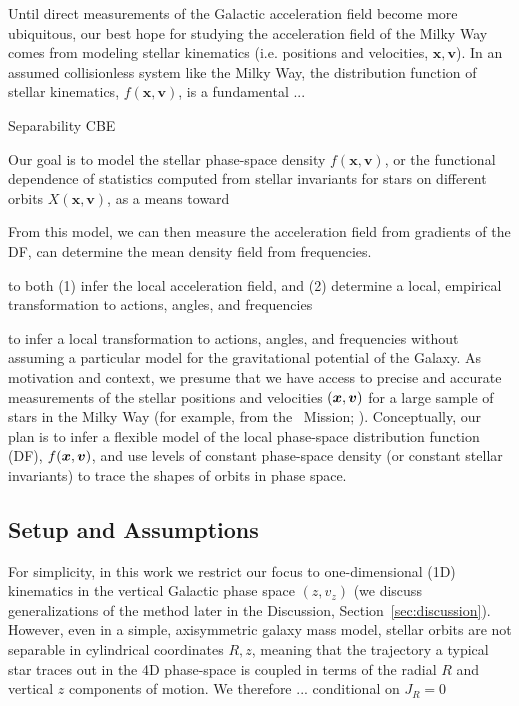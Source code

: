 
Until direct measurements of the Galactic acceleration field become more ubiquitous, our
best hope for studying the acceleration field of the Milky Way comes from modeling
stellar kinematics (i.e. positions and velocities, $\boldsymbol{x}, \boldsymbol{v}$).
In an assumed collisionless system like the Milky Way, the distribution function of
stellar kinematics, $f(\boldsymbol{x}, \boldsymbol{v})$, is a fundamental ...

Separability
CBE

Our goal is to model the stellar phase-space density
$f(\boldsymbol{x}, \boldsymbol{v})$, or the functional dependence of statistics computed
from stellar invariants for stars on different orbits $X(\boldsymbol{x},
\boldsymbol{v})$, as a means toward

From this model, we can then measure the acceleration field from gradients of the DF, can determine the mean density field from frequencies.

to both (1) infer the local acceleration field, and (2) determine a local, empirical transformation to actions, angles, and frequencies

to infer a local transformation to actions, angles,
and frequencies without assuming a particular model for the gravitational potential of
the Galaxy.
As motivation and context, we presume that we have access to precise and accurate
measurements of the stellar positions and velocities $(\boldsymbol{x}, \boldsymbol{v})$ for a large
sample of stars in the Milky Way (for example, from the \gaia\ Mission; \citealt{TODO}).
Conceptually, our plan is to infer a flexible model of the local phase-space
distribution function (DF), $f(\boldsymbol{x}, \boldsymbol{v})$, and use levels of constant phase-space
density (or constant stellar invariants) to trace the shapes of orbits in phase space.


\subsection{Setup and Assumptions} \label{sec:methods-setup}

For simplicity, in this work we restrict our focus to one-dimensional (1D) kinematics in
the vertical Galactic phase space $(z, v_z)$ (we discuss generalizations of the method
later in the Discussion, Section~\ref{sec:discussion}). %
However, even in a simple, axisymmetric galaxy mass model, stellar orbits are not
separable in cylindrical coordinates $R, z$, meaning that the trajectory a typical star
traces out in the 4D phase-space is coupled in terms of the radial $R$ and vertical $z$
components of motion.
We therefore ... conditional on $J_R=0$


